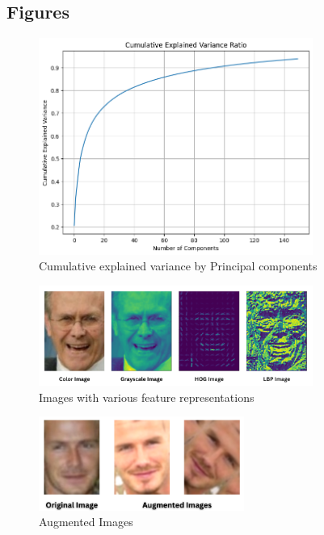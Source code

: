 \documentclass[a4paper]{article}
\theoremstyle{plain}
\theoremstyle{definition}
\begin{document}
	\subsection{Figures}
    \begin{figure}[!htb]
    \centering
    \includegraphics[width=0.8\textwidth]
    {figs/explained variance ratio.png}
    \caption{Cumulative explained variance by Principal components}
    \label{fig:img1}
\end{figure}

    \begin{figure}[!htb]
    \centering
    \includegraphics[width=0.8\textwidth]
    {figs/Image transforms.png}
    \caption{Images with various feature representations}
    \label{fig:img2}
\end{figure}

    \begin{figure}[!htb]
    \centering
    \includegraphics[width=0.6\textwidth]
    {figs/Augmented Images comparsion.png}
    \caption{Augmented Images}
    \label{fig:img3}
\end{figure}
\end{document}

